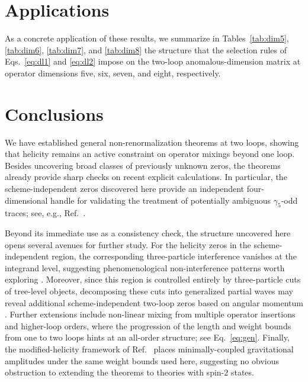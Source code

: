 \section{Applications\label{sec:2loopapplications}}

As a concrete application of these results, we summarize in Tables~\ref{tab:dim5}, \ref{tab:dim6}, \ref{tab:dim7}, and \ref{tab:dim8} the structure that the selection rules of
Eqs.~\eqref{eq:dl1} and \eqref{eq:dl2} impose on the two-loop anomalous-dimension matrix at operator
dimensions five, six, seven, and eight, respectively.






\section{Conclusions\label{sec:2loopconclusions}}

We have established general non-renormalization theorems at two loops, showing that helicity remains an active constraint on operator mixings beyond one loop. Besides uncovering broad classes of previously unknown zeros, the theorems already provide sharp checks on recent explicit calculations. 
In particular, the scheme-independent zeros discovered here provide an independent four-dimensional handle for validating the treatment of potentially ambiguous $\gamma_5$-odd traces; see, e.g., Ref.~\cite{Born:2026xkr}. 

Beyond its immediate use as a consistency check, the structure uncovered here opens several avenues for further study. 
For the helicity zeros in the scheme-independent region, the corresponding three-particle interference vanishes at the integrand level, suggesting phenomenological non-interference patterns worth exploring \cite{Azatov:2016sqh}. 
Moreover, since this region is controlled entirely by three-particle cuts of tree-level objects, decomposing these cuts into generalized partial waves may reveal additional scheme-independent two-loop zeros based on angular momentum \cite{Jiang:2020rwz}. 
Further extensions include non-linear mixing from multiple operator insertions and higher-loop orders, where the progression of the length and weight bounds from one to two loops hints at an all-order structure; see Eq.~\eqref{eq:gen}.
Finally, the modified-helicity framework of Ref.~\cite{Baratella:2021guc} places minimally-coupled gravitational amplitudes under the same weight bounds used here, 
suggesting no obvious obstruction to extending the theorems to theories with spin-$2$ states.